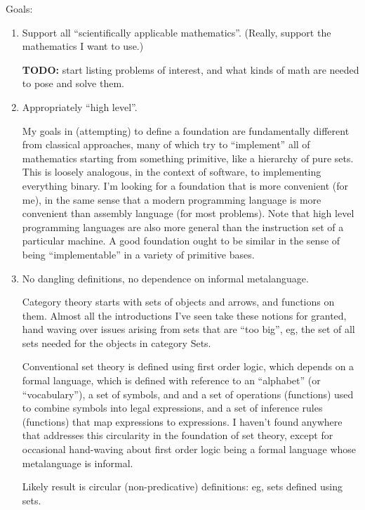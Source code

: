 \documentclass[11pt,openany]{article}
\begin{document}
\label{sec:good-foundation}

Goals:
\begin{enumerate}
  \item Support all ``scientifically applicable mathematics''.
  (Really, support the mathematics I want to use.) \par
  \textbf{TODO:} start listing problems of interest,
  and what kinds of math are needed to pose and solve them.
  
  \item Appropriately ``high level''. \par
  My goals in (attempting) to define a foundation are fundamentally
different from classical approaches,
many of which try to ``implement'' all of mathematics starting from
something primitive, like a hierarchy of pure sets.
This is loosely analogous, in the context of software,
to implementing everything binary.
I'm looking for a foundation that is more convenient (for me),
in the same sense that a modern programming language is more
convenient than assembly language (for most problems).
Note that high level programming languages are also more general
than the instruction set of a particular machine.
A good foundation ought to be similar in the sense of being
``implementable'' in a variety of primitive bases.

  \item No dangling definitions, no dependence on informal metalanguage.
   \par
  Category theory starts with sets of objects and arrows, 
  and functions on them. Almost all the introductions I've seen 
  take these notions for granted, hand waving over issues arising
  from sets that are ``too big'', eg, the set of all sets needed
  for the objects in category Sets.
  \par
  Conventional set theory is defined using first order logic,
  which depends on a formal language, which is defined with
  reference to an ``alphabet'' (or ``vocabulary''), 
  a set of symbols, and and a set of
  operations (functions) used to combine symbols into legal 
  expressions, and a set of inference rules (functions) that map
  expressions to expressions. I haven't found anywhere that
  addresses this circularity in the foundation of set theory,
  except for occasional hand-waving about first order logic
  being a formal language whose metalanguage is informal.
  \par
  Likely result is circular (non-predicative) definitions:
  eg, sets defined using sets.
  

\end{enumerate}
\end{document}
